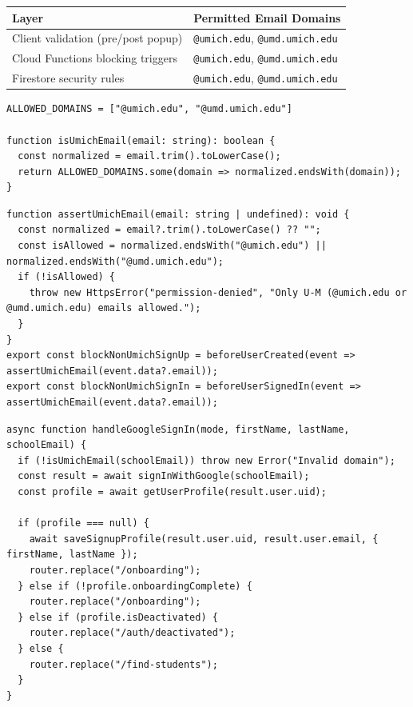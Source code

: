 \documentclass[11pt,letterpaper]{article}
\begin{document}
\begin{table}[h!]
\centering
\small
\begin{tabularx}{\textwidth}{l Y}
\toprule
\textbf{Layer} & \textbf{Permitted Email Domains} \\
\midrule
Client validation (pre/post popup) & \texttt{@umich.edu}, \texttt{@umd.umich.edu} \\
Cloud Functions blocking triggers & \texttt{@umich.edu}, \texttt{@umd.umich.edu} \\
Firestore security rules & \texttt{@umich.edu}, \texttt{@umd.umich.edu} \\
\bottomrule
\end{tabularx}
\end{table}

\begin{lstlisting}[caption={Client Domain Check Algorithm}]
ALLOWED_DOMAINS = ["@umich.edu", "@umd.umich.edu"]

function isUmichEmail(email: string): boolean {
  const normalized = email.trim().toLowerCase();
  return ALLOWED_DOMAINS.some(domain => normalized.endsWith(domain));
}
\end{lstlisting}

\begin{lstlisting}[caption={Server-Side Blocking Function Algorithm}]
function assertUmichEmail(email: string | undefined): void {
  const normalized = email?.trim().toLowerCase() ?? "";
  const isAllowed = normalized.endsWith("@umich.edu") || normalized.endsWith("@umd.umich.edu");
  if (!isAllowed) {
    throw new HttpsError("permission-denied", "Only U-M (@umich.edu or @umd.umich.edu) emails allowed.");
  }
}
export const blockNonUmichSignUp = beforeUserCreated(event => assertUmichEmail(event.data?.email));
export const blockNonUmichSignIn = beforeUserSignedIn(event => assertUmichEmail(event.data?.email));
\end{lstlisting}

\begin{lstlisting}[caption={Routing Algorithm Post-Authentication}]
async function handleGoogleSignIn(mode, firstName, lastName, schoolEmail) {
  if (!isUmichEmail(schoolEmail)) throw new Error("Invalid domain");
  const result = await signInWithGoogle(schoolEmail);
  const profile = await getUserProfile(result.user.uid);
  
  if (profile === null) {
    await saveSignupProfile(result.user.uid, result.user.email, { firstName, lastName });
    router.replace("/onboarding");
  } else if (!profile.onboardingComplete) {
    router.replace("/onboarding");
  } else if (profile.isDeactivated) {
    router.replace("/auth/deactivated");
  } else {
    router.replace("/find-students");
  }
}
\end{lstlisting}
\end{document}
